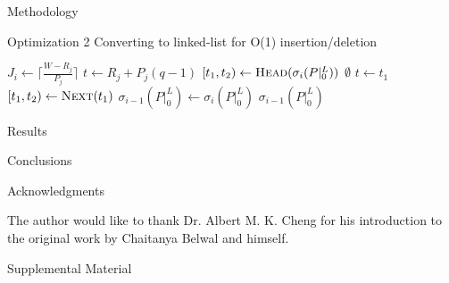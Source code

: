 \documentclass{article}
\begin{document}
\begin{section}{Methodology}
  \begin{subsection}{Optimization 2}
    Converting to linked-list for O(1) insertion/deletion
    \begin{algorithm}
      \caption{Gap-Tranformation Algorithm Optimization 2: No Zero Gaps Reinserted, Linked List}\label{gapxfrm2}
      \begin{algorithmic}[2]
          \State $J_{i} \gets \lceil\frac{W - R_{j}}{P_{j}}\rceil$
            \State $t \gets R_{j} + P_{j}(q-1)$
            \State $[t_{1},t_{2}) \gets \Call{Head}{\sigma_{i}(P|_{0}^{L})}$
            \While{$[t_{1},t_{2}) \not= \Call{Tail}{\sigma_{i}(P|_{0}^{L})}$}
                \State \Return $\emptyset$
              \EndIf
                \State $t \gets t_{1}$
              \EndIf
                    \State {$[t_{1},t_{2}) \gets [t_{1},t)$}
                  \Else
                    \State {\Call{Splice-Out}{$\sigma_{i}(P|_{0}^{L}), [t_{1},t_{2})$}}
                  \EndIf
                    \ExitWhile
                  \EndIf
                \EndIf
                    \State {$[t_{1},t_{2}) \gets [t + C_{j},t_{2})$}
                      \State \Call{Splice-In}{$\sigma_{i}(P|_{0}^{L}), [t_{1},t)$}
                    \EndIf
                  \ExitWhile
                \EndIf
              \EndIf
              \State $[t_{1},t_{2}) \gets \Call{Next}{t_{1}}$
            \EndWhile
          \EndFor
          \State $\sigma_{i-1}(P|_{0}^{L}) \gets \sigma_{i}(P|_{0}^{L})$
          \State \Return $\sigma_{i-1}(P|_{0}^{L})$
        \EndFunction
      \end{algorithmic}
      \end{algorithm}
  \end{subsection}

\end{section}

\begin{section}{Results}
\end{section}

\begin{section}{Conclusions}
\end{section}

\begin{section}{Acknowledgments}
  \begin{paragraph}{}
    The author would like to thank Dr. Albert M. K. Cheng for his introduction to the original work by Chaitanya Belwal and himself.
  \end{paragraph}
\end{section}

\printbibliography

\begin{section}{Supplemental Material}
\end{section}
\end{document}
